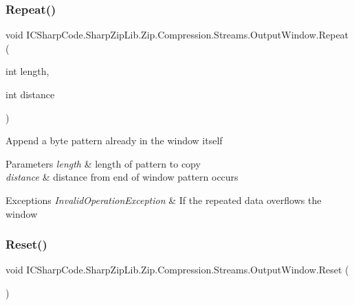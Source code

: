 \subsubsection{\texorpdfstring{Repeat()}{Repeat()}\hspace{0.1cm}{\footnotesize\ttfamily [2/2]}}
{\footnotesize\ttfamily void I\+C\+Sharp\+Code.\+Sharp\+Zip\+Lib.\+Zip.\+Compression.\+Streams.\+Output\+Window.\+Repeat (\begin{DoxyParamCaption}\item[{int}]{length,  }\item[{int}]{distance }\end{DoxyParamCaption})\hspace{0.3cm}{\ttfamily [inline]}}



Append a byte pattern already in the window itself 


\begin{DoxyParams}{Parameters}
{\em length} & length of pattern to copy\\
\hline
{\em distance} & distance from end of window pattern occurs\\
\hline
\end{DoxyParams}

\begin{DoxyExceptions}{Exceptions}
{\em Invalid\+Operation\+Exception} & If the repeated data overflows the window \\
\hline
\end{DoxyExceptions}
\mbox{\label{class_i_c_sharp_code_1_1_sharp_zip_lib_1_1_zip_1_1_compression_1_1_streams_1_1_output_window_af69f36602755df59247e2b16b77b0cd5}} 
\subsubsection{\texorpdfstring{Reset()}{Reset()}\hspace{0.1cm}{\footnotesize\ttfamily [1/2]}}
{\footnotesize\ttfamily void I\+C\+Sharp\+Code.\+Sharp\+Zip\+Lib.\+Zip.\+Compression.\+Streams.\+Output\+Window.\+Reset (\begin{DoxyParamCaption}{ }\end{DoxyParamCaption})\hspace{0.3cm}{\ttfamily [inline]}}



